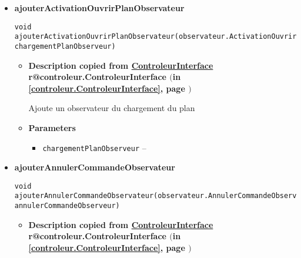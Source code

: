 \documentclass[11pt,a4paper]{report}
\makeatletter
\newcommand{\refdefined}[1]{
\expandafter\ifx\csname r@#1\endcsname\relax
\relax\else
{$($in \ref{#1}, page \pageref{#1}$)$}\fi}
\makeatother
\begin{document}
{{{{{\begin{itemize}
{\begin{itemize}
{Ajoute un observateur des changement du plan
}
\item{
{\bf  Parameters}
  \begin{itemize}
   \item{
\texttt{planObserveur} -- }
  \end{itemize}
}%
\end{itemize}
}%
\item{ 
\hypertarget{controleur.Controleur.ajouterActivationOuvrirPlanObservateur(controleur.observateur.ActivationOuvrirPlanObservateur)}{{\bf  ajouterActivationOuvrirPlanObservateur}\\}
\begin{lstlisting}[frame=none]
void ajouterActivationOuvrirPlanObservateur(observateur.ActivationOuvrirPlanObservateur chargementPlanObserveur)\end{lstlisting} %
\begin{itemize}
\item{
{\bf  Description copied from \hyperlink{controleur.ControleurInterface}{ControleurInterface}{\small \refdefined{controleur.ControleurInterface}} }

Ajoute un observateur du chargement du plan
}
\item{
{\bf  Parameters}
  \begin{itemize}
   \item{
\texttt{chargementPlanObserveur} -- }
  \end{itemize}
}%
\end{itemize}
}%
\item{ 
\hypertarget{controleur.Controleur.ajouterAnnulerCommandeObservateur(controleur.observateur.AnnulerCommandeObservateur)}{{\bf  ajouterAnnulerCommandeObservateur}\\}
\begin{lstlisting}[frame=none]
void ajouterAnnulerCommandeObservateur(observateur.AnnulerCommandeObservateur annulerCommandeObserveur)\end{lstlisting} %
\begin{itemize}
\item{
{\bf  Description copied from \hyperlink{controleur.ControleurInterface}{ControleurInterface}{\small \refdefined{controleur.ControleurInterface}} }

}
\end{itemize}}
\end{itemize}}}}}}
\end{document}
